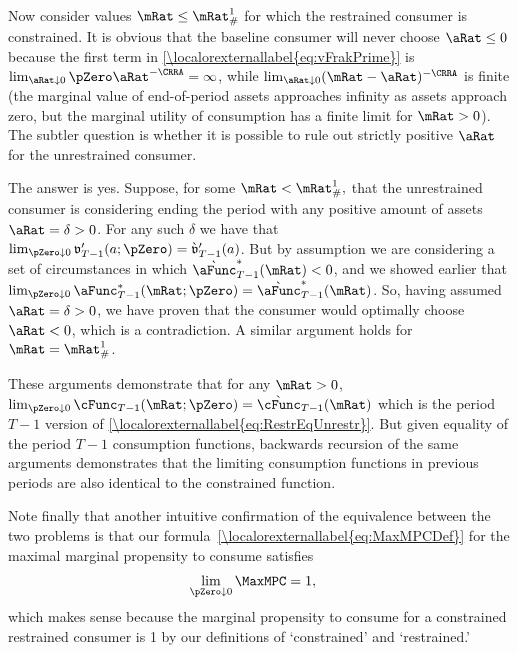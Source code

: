 \documentclass[\econtexRoot/BufferStockTheory]{subfiles}
\begin{document}
Now consider values $\mRat\leq \mRat^{1}_{\#}$ for which the restrained consumer
is constrained.  It is obvious that the baseline consumer will never
choose $\aRat \leq 0$ because the first term in \eqref{\localorexternallabel{eq:vFrakPrime}} is $\lim_{\aRat \downarrow 0} \pZero  \aRat^{-\CRRA} =
\infty$, while $\lim_{\aRat \downarrow 0} (\mRat-\aRat)^{-\CRRA}$ is finite (the
marginal value of end-of-period assets approaches infinity as assets approach
zero, but the marginal utility of consumption has a finite limit for $\mRat>0$).
The subtler question is whether it is possible to rule out strictly positive
$\aRat$ for the unrestrained consumer.

The answer is yes.  Suppose, for some $\mRat < \mRat^{1}_{\#},$ that the
unrestrained consumer is considering ending the period with any
positive amount of assets $\aRat=\delta > 0$.  For any such $\delta$ we
have that $\lim_{\pZero  \downarrow 0} \mathfrak{v}_{T-1}^{\prime}(a;\pZero)=\grave{\mathfrak{v}}_{T-1}^{\prime}(a)$.
But by assumption we are considering a set of circumstances in which
$\grave{\aFunc}_{T-1}^{*}(\mRat) < 0$, and we showed earlier that
$\lim_{\pZero  \downarrow 0} \aFunc_{T-1}^{*}(\mRat;\pZero) = \grave{\aFunc}_{T-1}^{*}(\mRat)$.  So,
having assumed $\aRat = \delta > 0$, we have proven that the consumer
would optimally choose $\aRat < 0$, which is a contradiction.  A similar
argument holds for $\mRat = \mRat^{1}_{\#}$.

These arguments demonstrate that for any $\mRat>0$, $\lim_{\pZero
  \downarrow 0} \cFunc_{T-1}(\mRat;\pZero) =
\grave{\cFunc}_{T-1}(\mRat)$ which is the period $T-1$ version of
\eqref{\localorexternallabel{eq:RestrEqUnrestr}}.  But given equality of the period $T-1$
consumption functions, backwards recursion of the same arguments
demonstrates that the limiting consumption functions in previous
periods are also identical to the constrained function.

Note finally that another intuitive confirmation of the equivalence
between the two problems is that our formula~\eqref{\localorexternallabel{eq:MaxMPCDef}} for the maximal marginal
propensity to consume satisfies
\begin{eqnarray*}
  \lim_{\pZero \downarrow 0} \MaxMPC  & = 1,
\end{eqnarray*}
which makes sense because the marginal propensity to consume for a
constrained restrained consumer is 1 by our definitions of
`constrained' and `restrained.'

\onlyinsubfile{}
\end{document}
